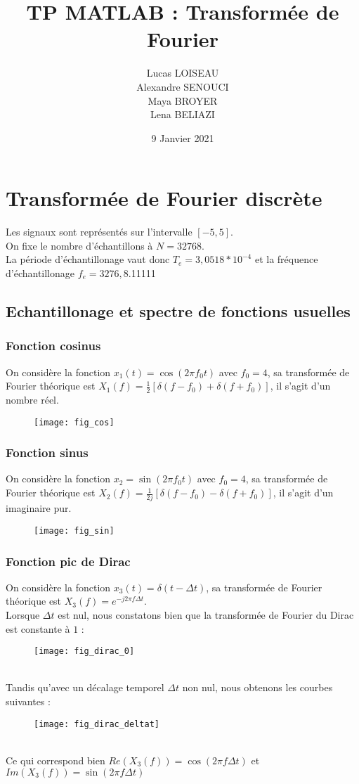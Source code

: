 \documentclass{article}
\title{TP MATLAB : Transformée de Fourier}
\date{9 Janvier 2021}
\author{Lucas LOISEAU \\ Alexandre SENOUCI \\ Maya BROYER \\ Lena BELIAZI}
\begin{document}
\maketitle
\section{Transformée de Fourier discrète}
Les signaux sont représentés sur l'intervalle $[-5,5]$. \\
On fixe le nombre d'échantillons à $N=32768$. \\
La période d'échantillonage vaut donc $T_e = 3,0518 * 10^{-4}$ et la fréquence d'échantillonage $f_e=3276,8$.11111
\subsection{Echantillonage et spectre de fonctions usuelles}
\subsubsection{Fonction cosinus}
On considère la fonction $x_1(t)=\cos(2\pi f_0 t)$ avec $f_0=4$, sa transformée de Fourier théorique est $X_1(f)=\frac{1}{2}[\delta(f-f_0)+\delta(f+f_0)]$, il s'agit d'un nombre réel.
\begin{figure}[h]
\texttt{[image: fig\_cos]}
\centering
\end{figure}

\subsubsection{Fonction sinus}
On considère la fonction $x_2=\sin(2\pi f_0 t)$ avec $f_0=4$, sa transformée de Fourier théorique est $X_2(f)=\frac{1}{2j}[\delta(f-f_0)-\delta(f+f_0)]$, il s'agit d'un imaginaire pur.
\begin{figure}[h]
\texttt{[image: fig\_sin]}
\centering
\end{figure}

\subsubsection{Fonction pic de Dirac}
On considère la fonction $x_3(t)=\delta(t-\Delta t)$, sa transformée de Fourier théorique est $X_3(f)=e^{-j2\pi f\Delta t}$. \\
Lorsque $\Delta t$ est nul, nous constatons bien que la transformée de Fourier du Dirac est constante à $1$ :
\begin{figure}[h]
\texttt{[image: fig\_dirac\_0]}
\centering
\end{figure} \\
Tandis qu'avec un décalage temporel $\Delta t$ non nul, nous obtenons les courbes suivantes :
\begin{figure}[h]
\texttt{[image: fig\_dirac\_deltat]}
\centering
\end{figure} \\
Ce qui correspond bien $Re(X_3(f))=\cos(2\pi f\Delta t)$ et $Im(X_3(f))=\sin(2\pi f\Delta t)$
\end{document}
